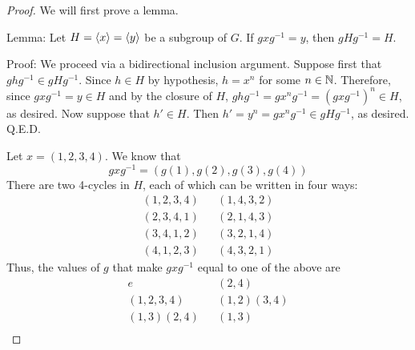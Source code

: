 \documentclass[../psets.tex]{subfiles}
\begin{document}
\begin{enumerate}
\begin{enumerate}
\begin{enumerate}
\begin{proof}


                


                We will first prove a lemma.\par\smallskip
                Lemma: Let $H=\left\langle{x}\right\rangle=\left\langle{y}\right\rangle$ be a subgroup of $G$. If $gxg^{-1}=y$, then $gHg^{-1}=H$.\par
                Proof: We proceed via a bidirectional inclusion argument. Suppose first that $ghg^{-1}\in gHg^{-1}$. Since $h\in H$ by hypothesis, $h=x^n$ for some $n\in\mathbb{N}$. Therefore, since $gxg^{-1}=y\in H$ and by the closure of $H$, $ghg^{-1}=gx^ng^{-1}=(gxg^{-1})^n\in H$, as desired. Now suppose that $h'\in H$. Then $h'=y^n=gx^ng^{-1}\in gHg^{-1}$, as desired. Q.E.D.\par\medskip
                Let $x=(1,2,3,4)$. We know that
                \begin{equation*}
                    gxg^{-1} = (g(1),g(2),g(3),g(4))
                \end{equation*}
                There are two 4-cycles in $H$, each of which can be written in four ways:
                \begin{align*}
                    (1,2,3,4)&&
                        (1,4,3,2)\\
                    (2,3,4,1)&&
                        (2,1,4,3)\\
                    (3,4,1,2)&&
                        (3,2,1,4)\\
                    (4,1,2,3)&&
                        (4,3,2,1)
                \end{align*}
                Thus, the values of $g$ that make $gxg^{-1}$ equal to one of the above are
                \begin{align*}
                    e&&
                        (2,4)\\
                    (1,2,3,4)&&
                        (1,2)(3,4)\\
                    (1,3)(2,4)&&
                        (1,3)\\

\end{align*}
\end{proof}
\end{enumerate}
\end{enumerate}
\end{enumerate}
\end{document}
